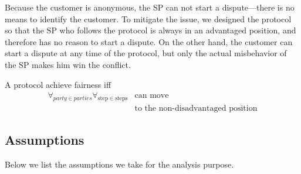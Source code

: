 Because the customer is anonymous, the SP can not start a dispute—there is no means to identify the customer. To mitigate the issue, we designed the protocol so that the SP who follows the protocol is always in an advantaged position, and therefore has no reason to start a dispute. On the other hand, the customer can start a dispute at any time of the protocol, but only the actual misbehavior of the SP makes him win the conflict.

\begin{definition}[Fairness] \label{def:fairness}
A protocol achieve fairness iff 
\begin{equation*}
\begin{split}
\forall_{party \in parties}\forall_{\mathrm{step} \in \mathrm{steps}} &\operatorname{can\ move}\\
&\operatorname{to\ the\ non-disadvantaged\ position} 
\end{split}
\end{equation*}

\end{definition}


\subsection{Assumptions}\label{sec:assumptions}

Below we list the assumptions we take for the analysis purpose.  

